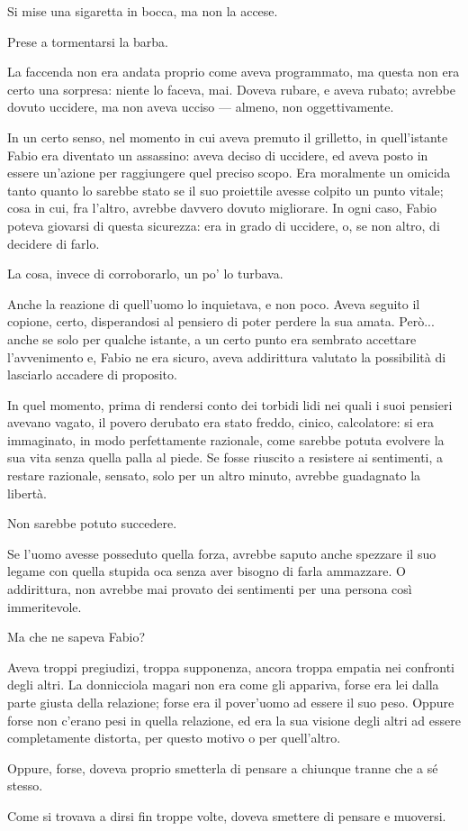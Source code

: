 Si mise una sigaretta in bocca, ma non la accese.

Prese a tormentarsi la barba.

La faccenda non era andata proprio come aveva programmato, ma questa non era certo una sorpresa: niente lo faceva, mai. Doveva rubare, e aveva rubato; avrebbe dovuto uccidere, ma non aveva ucciso --- almeno, non oggettivamente.

In un certo senso, nel momento in cui aveva premuto il grilletto, in quell'istante Fabio era diventato un assassino: aveva deciso di uccidere, ed aveva posto in essere un'azione per raggiungere quel preciso scopo. Era moralmente un omicida tanto quanto lo sarebbe stato se il suo proiettile avesse colpito un punto vitale; cosa in cui, fra l'altro, avrebbe davvero dovuto migliorare. In ogni caso, Fabio poteva giovarsi di questa sicurezza: era in grado di uccidere, o, se non altro, di decidere di farlo.

La cosa, invece di corroborarlo, un po' lo turbava.

Anche la reazione di quell'uomo lo inquietava, e non poco. Aveva seguito il copione, certo, disperandosi al pensiero di poter perdere la sua amata. Però... anche se solo per qualche istante, a un certo punto era sembrato accettare l'avvenimento e, Fabio ne era sicuro, aveva addirittura valutato la possibilità di lasciarlo accadere di proposito.

In quel momento, prima di rendersi conto dei torbidi lidi nei quali i suoi pensieri avevano vagato, il povero derubato era stato freddo, cinico, calcolatore: si era immaginato, in modo perfettamente razionale, come sarebbe potuta evolvere la sua vita senza quella palla al piede. Se fosse riuscito a resistere ai sentimenti, a restare razionale, sensato, solo per un altro minuto, avrebbe guadagnato la libertà.

Non sarebbe potuto succedere.

Se l'uomo avesse posseduto quella forza, avrebbe saputo anche spezzare il suo legame con quella stupida oca senza aver bisogno di farla ammazzare. O addirittura, non avrebbe mai provato dei sentimenti per una persona così immeritevole.

Ma che ne sapeva Fabio?

Aveva troppi pregiudizi, troppa supponenza, ancora troppa empatia nei confronti degli altri. La donnicciola magari non era come gli appariva, forse era lei dalla parte giusta della relazione; forse era il pover'uomo ad essere il suo peso. Oppure forse non c'erano pesi in quella relazione, ed era la sua visione degli altri ad essere completamente distorta, per questo motivo o per quell'altro.

Oppure, forse, doveva proprio smetterla di pensare a chiunque tranne che a sé stesso.

Come si trovava a dirsi fin troppe volte, doveva smettere di pensare e muoversi.
